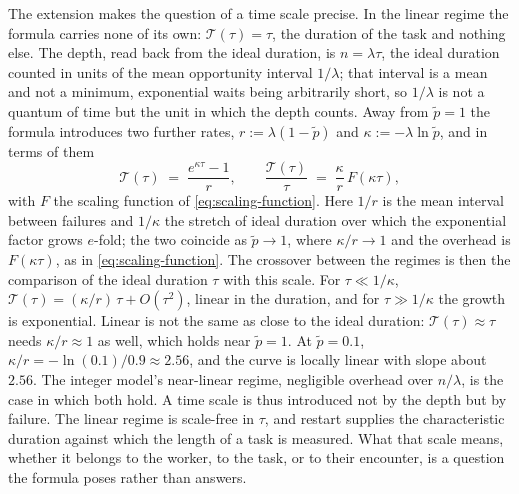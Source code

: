 \documentclass{article}
\begin{document}
The extension makes the question of a time scale precise. In the linear regime the formula carries none of its own: $\mathcal{T}(\tau) = \tau$, the duration of the task and nothing else. The depth, read back from the ideal duration, is $n = \lambda\tau$, the ideal duration counted in units of the mean opportunity interval $1/\lambda$; that interval is a mean and not a minimum, exponential waits being arbitrarily short, so $1/\lambda$ is not a quantum of time but the unit in which the depth counts. Away from $\widetilde{p} = 1$ the formula introduces two further rates, $r := \lambda(1 - \widetilde{p})$ and $\kappa := -\lambda\ln\widetilde{p}$, and in terms of them
\begin{equation}\label{eq:continuous-rates}
\mathcal{T}(\tau) \;=\; \frac{e^{\kappa\tau} - 1}{r}, \qquad \frac{\mathcal{T}(\tau)}{\tau} \;=\; \frac{\kappa}{r}\,F(\kappa\tau),
\end{equation}
with $F$ the scaling function of \eqref{eq:scaling-function}. Here $1/r$ is the mean interval between failures and $1/\kappa$ the stretch of ideal duration over which the exponential factor grows $e$-fold; the two coincide as $\widetilde{p} \to 1$, where $\kappa/r \to 1$ and the overhead is $F(\kappa\tau)$, as in \eqref{eq:scaling-function}. The crossover between the regimes is then the comparison of the ideal duration $\tau$ with this scale. For $\tau \ll 1/\kappa$, $\mathcal{T}(\tau) = (\kappa/r)\,\tau + O(\tau^{2})$, linear in the duration, and for $\tau \gg 1/\kappa$ the growth is exponential. Linear is not the same as close to the ideal duration: $\mathcal{T}(\tau) \approx \tau$ needs $\kappa/r \approx 1$ as well, which holds near $\widetilde{p} = 1$. At $\widetilde{p} = 0.1$, $\kappa/r = -\ln(0.1)/0.9 \approx 2.56$, and the curve is locally linear with slope about $2.56$. The integer model's near-linear regime, negligible overhead over $n/\lambda$, is the case in which both hold. A time scale is thus introduced not by the depth but by failure. The linear regime is scale-free in $\tau$, and restart supplies the characteristic duration against which the length of a task is measured. What that scale means, whether it belongs to the worker, to the task, or to their encounter, is a question the formula poses rather than answers.
\end{document}
